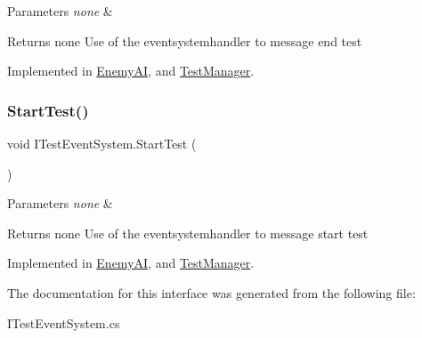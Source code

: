 \begin{DoxyParams}{Parameters}
{\em none} & \\
\hline
\end{DoxyParams}
\begin{DoxyReturn}{Returns}
none Use of the eventsystemhandler to message end test 
\end{DoxyReturn}


Implemented in \mbox{\hyperlink{class_enemy_a_i_a63dc8e816322f34ec0360a1189fb931e}{Enemy\+AI}}, and \mbox{\hyperlink{class_test_manager_a39a04c0d50c7be1322ad25e67696e549}{Test\+Manager}}.

\mbox{\label{interface_i_test_event_system_aefeb7857cc94ecb2bacb47975f6474bb}} 
\subsubsection{\texorpdfstring{Start\+Test()}{StartTest()}}
{\footnotesize\ttfamily void I\+Test\+Event\+System.\+Start\+Test (\begin{DoxyParamCaption}{ }\end{DoxyParamCaption})}


\begin{DoxyParams}{Parameters}
{\em none} & \\
\hline
\end{DoxyParams}
\begin{DoxyReturn}{Returns}
none Use of the eventsystemhandler to message start test 
\end{DoxyReturn}


Implemented in \mbox{\hyperlink{class_enemy_a_i_a8d23dd153a4f273abaae5c174d10a6d2}{Enemy\+AI}}, and \mbox{\hyperlink{class_test_manager_a74fe528d0e18c4cca484bca002dc4f2b}{Test\+Manager}}.



The documentation for this interface was generated from the following file\+:\begin{DoxyCompactItemize}
\item 
I\+Test\+Event\+System.\+cs\end{DoxyCompactItemize}
